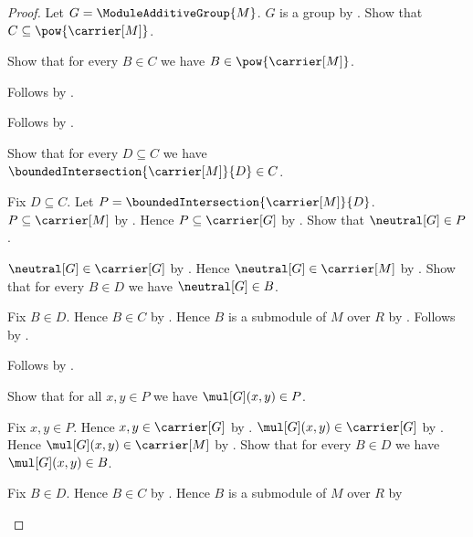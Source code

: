 \begin{proof}
    Let $G=\ModuleAdditiveGroup{M}$.
    $G$ is a group by .
    Show that $C\subseteq\pow{\carrier[M]}$.
    \begin{subproof}
        Show that for every $B\in C$ we have
            $B\in\pow{\carrier[M]}$.
        \begin{subproof}
            Follows by \auto.
        \end{subproof}
        Follows by .
    \end{subproof}
    Show that for every $D\subseteq C$ we have
        $\boundedIntersection{\carrier[M]}{D}\in C$.
    \begin{subproof}
        Fix $D\subseteq C$.
        Let $P=\boundedIntersection{\carrier[M]}{D}$.
        $P\subseteq\carrier[M]$ by
            .
        Hence $P\subseteq\carrier[G]$ by
            .
        Show that $\neutral[G]\in P$.
        \begin{subproof}
            $\neutral[G]\in\carrier[G]$ by
                .
            Hence $\neutral[G]\in\carrier[M]$ by
                .
            Show that for every $B\in D$ we have $\neutral[G]\in B$.
            \begin{subproof}
                Fix $B\in D$.
                Hence $B\in C$ by .
                Hence $B$ is a submodule of $M$ over $R$ by
                    \auto.
                Follows by
                    .
            \end{subproof}
            Follows by .
        \end{subproof}
        Show that for all $x,y\in P$ we have $\mul[G](x,y)\in P$.
        \begin{subproof}
            Fix $x,y\in P$.
            Hence $x,y\in\carrier[G]$ by .
            $\mul[G](x,y)\in\carrier[G]$ by
                .
            Hence $\mul[G](x,y)\in\carrier[M]$ by
                .
            Show that for every $B\in D$ we have $\mul[G](x,y)\in B$.
            \begin{subproof}
                Fix $B\in D$.
                Hence $B\in C$ by .
                Hence $B$ is a submodule of $M$ over $R$ by

\end{subproof}
\end{subproof}
\end{subproof}
\end{proof}
